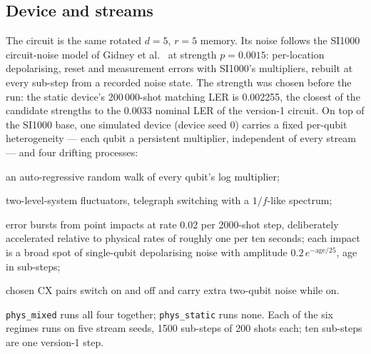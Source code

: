 \documentclass[11pt,a4paper]{article}
\newcommand{\reg}[1]{\texttt{#1}}
\begin{document}
\subsection{Device and streams}\label{sec:phys-setup}
The circuit is the same rotated $d=5$, $r=5$ memory. Its noise follows the SI1000 circuit-noise model of
Gidney et al.~\cite{gidney2021honeycomb} at strength $p=0.0015$: per-location depolarising, reset and
measurement errors with SI1000's multipliers, rebuilt at every sub-step from a recorded noise state. The
strength was chosen before the run: the static device's 200\,000-shot matching LER is 0.002255, the closest
of the candidate strengths to the 0.0033 nominal LER of the version-1 circuit. On top of the SI1000 base,
one simulated device (device seed 0) carries a fixed per-qubit heterogeneity --- each qubit a persistent
multiplier, independent of every stream --- and four drifting processes:
\begin{description}[leftmargin=1.2em, labelindent=0em, itemsep=1pt]
\item[\reg{phys\_slow}] an auto-regressive random walk of every qubit's log multiplier;
\item[\reg{phys\_tls}] two-level-system fluctuators, telegraph switching with a $1/f$-like spectrum;
\item[\reg{phys\_cosmic}] error bursts from point impacts at rate 0.02 per 2000-shot step, deliberately
  accelerated relative to physical rates of roughly one per ten seconds; each impact is a broad spot of
  single-qubit depolarising noise with amplitude $0.2\,e^{-\mathrm{age}/25}$, age in sub-steps;
\item[\reg{phys\_coupler}] chosen CX pairs switch on and off and carry extra two-qubit noise while on.
\end{description}
\reg{phys\_mixed} runs all four together; \reg{phys\_static} runs none. Each of the six regimes runs on five
stream seeds, 1500 sub-steps of 200 shots each; ten sub-steps are one version-1 step.
\end{document}
